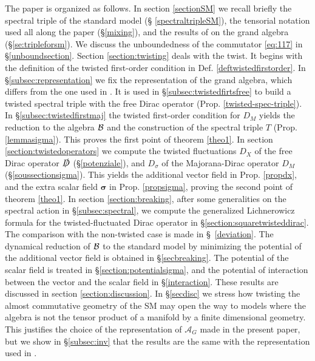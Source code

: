 \documentclass[11pt]{article}
\newcommand{\A}{\mathcal A}
\newcommand{\Ds}{\slashed D}
\begin{document}
The paper is organized as follows. In section \ref{sectionSM} we
recall briefly the spectral triple of the standard model (\S
\ref{spectraltripleSM}), the tensorial notation used all
along the paper (\S\ref{mixing}), and the
results of \cite{Devastato:2013fk} on the grand algebra (\S \ref{se:tripleforsm}). We discuss the unboundedness
of the commutator \eqref{eq:117} in \S\ref{unboundsection}.  
Section \ref{section:twisting} deals with the twist. It begins with
the definition of the twisted first-order
condition in Def. \ref{deftwistedfirstorder}. In
\S \ref{subsec:representation} we fix the
representation of the grand algebra, which differs from the one used
in \cite{Devastato:2013fk}. It is used in \S\ref{subsec:twistedfirtsfree}
to build a  twisted
spectral triple with the free Dirac operator
(Prop. \ref{twisted-spec-triple}). In \S \ref{subsec:twistedfirstmaj} the twisted first-order condition for
$D_M$ yields the reduction to the algebra $\cal B$ and the
construction of the spectral triple $T$ (Prop. \ref{lemmasigma}). This
proves the first point of theorem \ref{theo1}.
In section \ref{section:twistedoperators} we compute the twisted fluctuations
$D_X$ of the free Dirac
operator $\Ds$ (\S\ref{potenziale}), and $D_\sigma$ of the
Majorana-Dirac operator $D_M$ (\S\ref{soussectionsigma}).
This yields the additional vector field in Prop. \ref{propdx}, and the
extra scalar field $\boldsymbol\sigma$ in
Prop. \ref{propsigma}, proving the second point of theorem \ref{theo1}.
In section \ref{section:breaking}, after some  generalities on the spectral
action in \S\ref{subsec:spectral}, we compute the generalized
Lichnerowicz formula for the twisted-fluctuated Dirac operator in
\S \ref{section:squaretwisteddirac}. The comparison with the
non-twisted case is made in \S~\ref{deviation}. The dynamical reduction of $\cal
B$ to the standard model by minimizing the potential of the additional
vector field is
obtained in \S \ref{secbreaking}. The potential of the scalar field is
treated in \S\ref{section:potentialsigma}, and the potential of
interaction between the vector and the scalar field in \S\ref{interaction}.
 These results are
discussed in section \ref{section:discussion}.   In  \S\ref{secdisc}
we stress how twisting the almost
commutative geometry of the SM may open the way to models where the
algebra is not the tensor product of a manifold by a finite
dimensional geometry. This justifies the choice of the representation
of $\A_G$ made in the present paper, but we show in \S\ref{subsec:inv}  that the results are the
same with the representation used in \cite{Devastato:2013fk}. 
\bigskip
\end{document}
